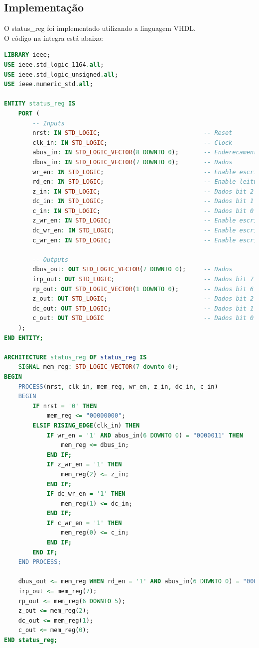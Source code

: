 \documentclass{article}
\begin{document}
\subsection{Implementação}

O status\_reg foi implementado utilizando a linguagem VHDL.\\

O código na íntegra está abaixo:\\

\begin{lstlisting}[language=VHDL, caption={Código VHDL status\_reg}]
LIBRARY ieee;
USE ieee.std_logic_1164.all;
USE ieee.std_logic_unsigned.all;
USE ieee.numeric_std.all;

ENTITY status_reg IS
    PORT (
        -- Inputs
        nrst: IN STD_LOGIC;                             -- Reset
        clk_in: IN STD_LOGIC;                           -- Clock
        abus_in: IN STD_LOGIC_VECTOR(8 DOWNTO 0);       -- Enderecamento
        dbus_in: IN STD_LOGIC_VECTOR(7 DOWNTO 0);       -- Dados
        wr_en: IN STD_LOGIC;                            -- Enable escrita
        rd_en: IN STD_LOGIC;                            -- Enable leitura
        z_in: IN STD_LOGIC;                             -- Dados bit 2
        dc_in: IN STD_LOGIC;                            -- Dados bit 1
        c_in: IN STD_LOGIC;                             -- Dados bit 0
        z_wr_en: IN STD_LOGIC;                          -- Enable escrita bit 2
        dc_wr_en: IN STD_LOGIC;                         -- Enable escrita bit 1
        c_wr_en: IN STD_LOGIC;                          -- Enable escrita bit 0

        -- Outputs
        dbus_out: OUT STD_LOGIC_VECTOR(7 DOWNTO 0);     -- Dados
        irp_out: OUT STD_LOGIC;                         -- Dados bit 7
        rp_out: OUT STD_LOGIC_VECTOR(1 DOWNTO 0);       -- Dados bit 6 e 5
        z_out: OUT STD_LOGIC;                           -- Dados bit 2
        dc_out: OUT STD_LOGIC;                          -- Dados bit 1
        c_out: OUT STD_LOGIC                            -- Dados bit 0
    );  
END ENTITY;

ARCHITECTURE status_reg OF status_reg IS
    SIGNAL mem_reg: STD_LOGIC_VECTOR(7 downto 0);
BEGIN
    PROCESS(nrst, clk_in, mem_reg, wr_en, z_in, dc_in, c_in)
    BEGIN
        IF nrst = '0' THEN 
            mem_reg <= "00000000";
        ELSIF RISING_EDGE(clk_in) THEN
            IF wr_en = '1' AND abus_in(6 DOWNTO 0) = "0000011" THEN
                mem_reg <= dbus_in;
            END IF;
            IF z_wr_en = '1' THEN
                mem_reg(2) <= z_in;
            END IF;
            IF dc_wr_en = '1' THEN
                mem_reg(1) <= dc_in;
            END IF;
            IF c_wr_en = '1' THEN
                mem_reg(0) <= c_in;
            END IF;
        END IF;
    END PROCESS;
    
    dbus_out <= mem_reg WHEN rd_en = '1' AND abus_in(6 DOWNTO 0) = "0000011" ELSE "ZZZZZZZZ";
    irp_out <= mem_reg(7);
    rp_out <= mem_reg(6 DOWNTO 5);
    z_out <= mem_reg(2);
    dc_out <= mem_reg(1);
    c_out <= mem_reg(0);
END status_reg;
\end{lstlisting}
\end{document}

